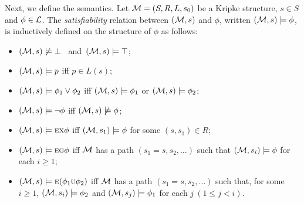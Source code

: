 \documentclass[letterpaper]{article}
\begin{document}

Next, we define the semantics.
Let ${\cal M}=(S,R,L,s_0)$ be a Kripke structure, $s\in S$ and $\phi \in \cal L$.
The {\em satisfiability} relation between $({\cal M},s)$ and $\phi$,
written $({\cal M},s)\models\phi$, is inductively defined on the structure of $\phi$ as follows:

\begin{itemize}
  \item $({\cal M},s)\not\models\bot$ \ and\  $({\cal M},s)\models\top$;
  \item $({\cal M},s)\models p$ iff $p\in L(s)$;
  \item $({\cal M},s)\models \phi_1\lor\phi_2$ iff
    $({\cal M},s)\models \phi_1$ or $({\cal M},s)\models \phi_2$;
  \item $({\cal M},s)\models \neg\phi$ iff  $({\cal M},s)\not\models\phi$;
  \item $({\cal M},s)\models \textsc{e}\textsc{x}\phi$ iff
    $({\cal M},s_1)\models\phi$ for some $(s,s_1)\in R$;
  \item $({\cal M},s)\models \textsc{e}\textsc{g}\phi$ iff
    $\cal M$ has a path $(s_1=s,s_2,\ldots)$ such that
    $({\cal M},s_i)\models\phi$ for each $i\ge 1$;
  \item $({\cal M},s)\models \textsc{e}(\phi_1\textsc{u}\phi_2)$ iff
    $\cal M$ has a path $(s_1=s,s_2,\ldots)$ such that, for some $i\ge 1$,
    $({\cal M},s_i)\models\phi_2$ and
    $({\cal M},s_j)\models\phi_1$ for each $j~(1\leq j<i)$.
\end{itemize}
\end{document}
